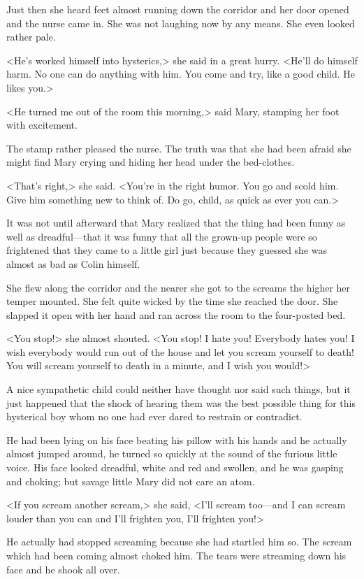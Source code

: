 Just then she heard feet almost running down the corridor and her door opened and the nurse came in. She was not laughing now by any means. She even looked rather pale.

<He's worked himself into hysterics,> she said in a great hurry. <He'll do himself harm. No one can do anything with him. You come and try, like a good child. He likes you.>

<He turned me out of the room this morning,> said Mary, stamping her foot with excitement.

The stamp rather pleased the nurse. The truth was that she had been afraid she might find Mary crying and hiding her head under the bed-clothes.

<That's right,> she said. <You're in the right humor. You go and scold him. Give him something new to think of. Do go, child, as quick as ever you can.>

It was not until afterward that Mary realized that the thing had been funny as well as dreadful—that it was funny that all the grown-up people were so frightened that they came to a little girl just because they guessed she was almost as bad as Colin himself.

She flew along the corridor and the nearer she got to the screams the higher her temper mounted. She felt quite wicked by the time she reached the door. She slapped it open with her hand and ran across the room to the four-posted bed.

<You stop!> she almost shouted. <You stop! I hate you! Everybody hates you! I wish everybody would run out of the house and let you scream yourself to death! You will scream yourself to death in a minute, and I wish you would!>

A nice sympathetic child could neither have thought nor said such things, but it just happened that the shock of hearing them was the best possible thing for this hysterical boy whom no one had ever dared to restrain or contradict.

He had been lying on his face beating his pillow with his hands and he actually almost jumped around, he turned so quickly at the sound of the furious little voice. His face looked dreadful, white and red and swollen, and he was gasping and choking; but savage little Mary did not care an atom.

<If you scream another scream,> she said, <I'll scream too—and I can scream louder than you can and I'll frighten you, I'll frighten you!>

He actually had stopped screaming because she had startled him so. The scream which had been coming almost choked him. The tears were streaming down his face and he shook all over.


